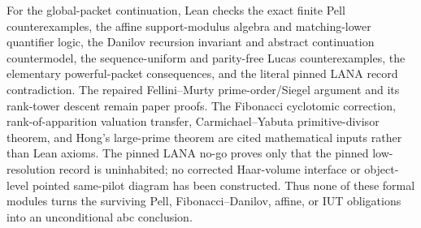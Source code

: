 \documentclass[11pt]{amsart}
\theoremstyle{definition}
\theoremstyle{remark}
\begin{document}
For the global-packet continuation, Lean checks the exact finite Pell
counterexamples, the affine support-modulus algebra and matching-lower
quantifier logic, the Danilov recursion invariant and abstract continuation
countermodel, the sequence-uniform and parity-free Lucas counterexamples,
the elementary powerful-packet consequences, and the literal pinned LANA
record contradiction.  The repaired
Fellini--Murty prime-order/Siegel argument and its rank-tower descent remain
paper proofs.  The Fibonacci cyclotomic correction, rank-of-apparition
valuation transfer, Carmichael--Yabuta primitive-divisor theorem, and Hong's
large-prime theorem are cited mathematical inputs rather than Lean axioms.
The pinned LANA no-go proves only that the pinned low-resolution record is
uninhabited; no corrected Haar-volume interface or object-level pointed
same-pilot diagram has been constructed.  Thus none of these formal modules
turns the surviving Pell, Fibonacci--Danilov, affine, or IUT obligations into
an unconditional abc conclusion.
\end{document}
